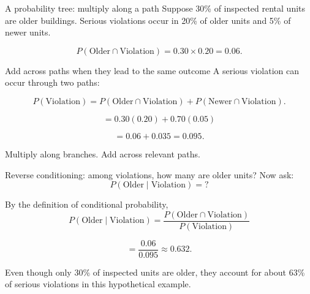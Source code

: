 \documentclass[11pt,aspectratio=169]{beamer}
\newcommand{\prob}[1]{P\!\left(#1\right)}
\newcommand{\condprob}[2]{P\!\left(#1\mid #2\right)}
\begin{document}
\begin{frame}{A probability tree: multiply along a path}
\small Suppose 30\% of inspected rental units are older buildings. Serious violations occur in 20\% of older units and 5\% of newer units.

\begin{center}
\end{center}

\vspace{-0.2em}
\[
\prob{\text{Older}\cap\text{Violation}}
=0.30\times0.20=\boxed{0.06}.
\]
\end{frame}

\begin{frame}{Add across paths when they lead to the same outcome}
A serious violation can occur through two paths:

\[
\prob{\text{Violation}}
=\prob{\text{Older}\cap\text{Violation}}
+\prob{\text{Newer}\cap\text{Violation}}.
\]

\[
=0.30(0.20)+0.70(0.05)
\]

\[
=0.06+0.035=\boxed{0.095}.
\]

\vfill
\begin{center}
\Large Multiply \alert{along} branches. Add \alert{across} relevant paths.
\end{center}
\end{frame}

\begin{frame}{Reverse conditioning: among violations, how many are older units?}
Now ask:
\[
\condprob{\text{Older}}{\text{Violation}}=?
\]

By the definition of conditional probability,
\[
\condprob{\text{Older}}{\text{Violation}}
=\frac{\prob{\text{Older}\cap\text{Violation}}}{\prob{\text{Violation}}}
\]

\[
=\frac{0.06}{0.095}\approx\boxed{0.632}.
\]

\vfill
Even though only 30\% of inspected units are older, they account for about 63\% of serious violations in this hypothetical example.
\end{frame}
\end{document}
